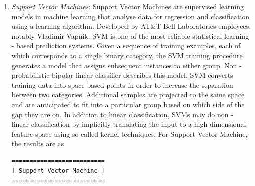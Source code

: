 \documentclass[sn-basic]{sn-jnl}%
\theoremstyle{thmstyleone}%
\theoremstyle{thmstyletwo}%
\theoremstyle{thmstylethree}%
\begin{document}
\begin{enumerate}
\item \textit{Support Vector Machines}: Support Vector Machines are supervised learning models in machine learning that analyse data for regression and classification using a learning algorithm. Developed by AT\&T Bell Laboratories employees, notably Vladimir Vapnik. SVM is one of the most reliable statistical learning - based prediction systems. Given a sequence of training examples, each of which corresponds to a single binary category, the SVM training procedure generates a model that assigns subsequent instances to either group. Non - probabilistic bipolar linear classifier describes this model. SVM converts training data into space-based points in order to increase the separation between two categories. Additional samples are projected to the same space and are anticipated to fit into a particular group based on which side of the gap they are on. In addition to linear classification, SVMs may do non - linear classification by implicitly translating the input to a high-dimensional feature space using so called kernel techniques. For Support Vector Machine, the results are as
\begin{verbatim}
==========================
[ Support Vector Machine ]
==========================


\end{verbatim}
\end{enumerate}
\end{document}
